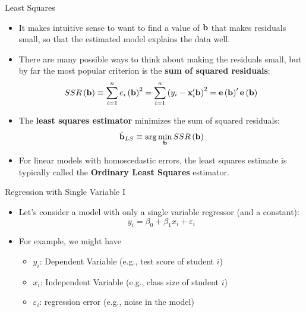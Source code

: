 \documentclass[aspectratio=169,11pt]{beamer}
\begin{document}
\begin{frame}{Least Squares}
\begin{itemize}
	\item It makes intuitive sense to want to find a value of ${\bf b}$
	 that makes residuals small, so that the estimated model explains the data well.

	\smallskip
	\item There are many possible ways to think about making the residuals small, but
	by far the most popular criterion is the {\bf sum of squared residuals}:\[
		SSR\left({\bf b}\right) \equiv \sum_{i=1}^{n} e_i \left({\bf b}\right)^2  =  \sum_{i=1}^{n} \left(y_i - {\bf x}_i' {\bf b}\right)^{2} = {\bf e} \left({\bf b}\right) '  {\bf e} \left({\bf b}\right)
	\]

	\smallskip
	\item The {\bf least squares estimator} minimizes the sum of squared residuals:\[
		\hat{{\bf b}}_{LS} \equiv \arg \min_{{\bf b}} SSR\left({\bf b}\right) 
	\]

	\smallskip
	\item For linear models with homoscedastic errors, the least squares estimate is typically called the
	{\bf Ordinary Least Squares} estimator.

\end{itemize}
\end{frame}



\begin{frame}{Regression with Single Variable I}
	\begin{itemize}
	
	\item Let's consider a model with only a single variable regressor (and a constant):\[
	y_i = \beta_0 + \beta_1 x_i + \varepsilon_i
	\]

	\medskip
	\item For example, we might have 
	\begin{itemize}
		\item $y_i$: Dependent Variable (e.g., test score of student $i$)
		\item $x_i$: Independent Variable (e.g., class size of student $i$)
		\item $\varepsilon_i$: regression error (e.g., noise in the model)
	\end{itemize}

	\end{itemize}
\end{frame}
\end{document}
